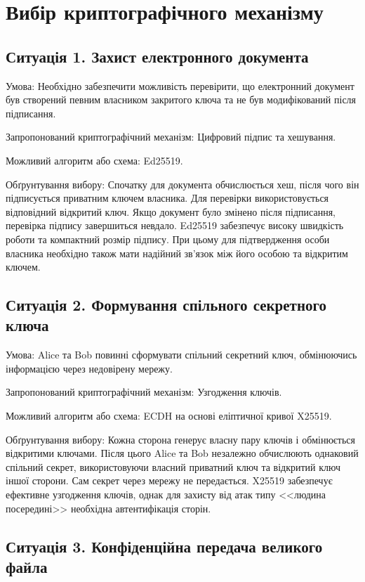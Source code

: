 \section{Вибір криптографічного механізму}

\subsection{Ситуація 1. Захист електронного документа}

Умова: Необхідно забезпечити можливість перевірити, 
що електронний документ був створений певним власником закритого 
ключа та не був модифікований після підписання.

Запропонований криптографічний механізм: Цифровий підпис та хешування.

Можливий алгоритм або схема: Ed25519.

Обґрунтування вибору: Спочатку для документа обчислюється хеш, 
після чого він підписується приватним ключем власника. Для перевірки 
використовується відповідний відкритий ключ. Якщо документ було змінено 
після підписання, перевірка підпису завершиться невдало. Ed25519 забезпечує 
високу швидкість роботи та компактний розмір підпису. При цьому для підтвердження 
особи власника необхідно також мати надійний зв'язок між його особою та відкритим ключем.

\subsection{Ситуація 2. Формування спільного секретного ключа}

Умова: Alice та Bob повинні сформувати спільний секретний ключ, обмінюючись 
інформацією через недовірену мережу.

Запропонований криптографічний механізм: Узгодження ключів.

Можливий алгоритм або схема: ECDH на основі еліптичної кривої X25519.

Обґрунтування вибору: Кожна сторона генерує власну пару ключів і обмінюється відкритими ключами. 
Після цього Alice та Bob незалежно обчислюють однаковий спільний секрет, використовуючи власний приватний 
ключ та відкритий ключ іншої сторони. Сам секрет через мережу не передається. X25519 забезпечує ефективне 
узгодження ключів, однак для захисту від атак типу <<людина посередині>> необхідна автентифікація сторін.

\subsection{Ситуація 3. Конфіденційна передача великого файла}

